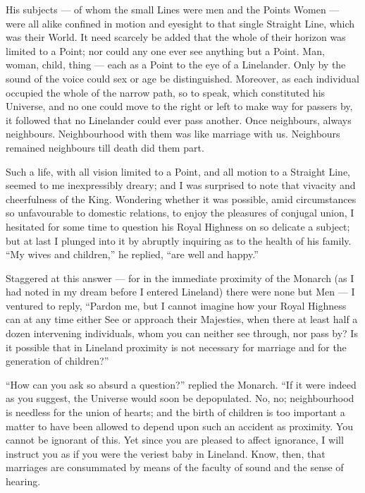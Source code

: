 \documentclass[10pt, kindle, oneside]{kindle}
\begin{document}
His subjects --- of whom the small Lines were men and the Points Women --- were
all alike confined in motion and eyesight to that single Straight Line, which
was their World. It need scarcely be added that the whole of their horizon was
limited to a Point; nor could any one ever see anything but a Point. Man,
woman, child, thing --- each as a Point to the eye of a Linelander. Only by the
sound of the voice could sex or age be distinguished. Moreover, as each
individual occupied the whole of the narrow path, so to speak, which
constituted his Universe, and no one could move to the right or left to make
way for passers by, it followed that no Linelander could ever pass another.
Once neighbours, always neighbours. Neighbourhood with them was like marriage
with us. Neighbours remained neighbours till death did them part.

Such a life, with all vision limited to a Point, and all motion to a Straight
Line, seemed to me inexpressibly dreary; and I was surprised to note that
vivacity and cheerfulness of the King. Wondering whether it was possible, amid
circumstances so unfavourable to domestic relations, to enjoy the pleasures of
conjugal union, I hesitated for some time to question his Royal Highness on so
delicate a subject; but at last I plunged into it by abruptly inquiring as to
the health of his family. ``My wives and children,'' he replied, ``are well and
happy.''

Staggered at this answer --- for in the immediate proximity of the Monarch (as I
had noted in my dream before I entered Lineland) there were none but Men --- I
ventured to reply, ``Pardon me, but I cannot imagine how your Royal Highness
can at any time either See or approach their Majesties, when there at least
half a dozen intervening individuals, whom you can neither see through, nor
pass by? Is it possible that in Lineland proximity is not necessary for
marriage and for the generation of children?''

``How can you ask so absurd a question?'' replied the Monarch. ``If it were
indeed as you suggest, the Universe would soon be depopulated. No, no;
neighbourhood is needless for the union of hearts; and the birth of children
is too important a matter to have been allowed to depend upon such an accident
as proximity. You cannot be ignorant of this. Yet since you are pleased to
affect ignorance, I will instruct you as if you were the veriest baby in
Lineland. Know, then, that marriages are consummated by means of the faculty
of sound and the sense of hearing.
\end{document}
